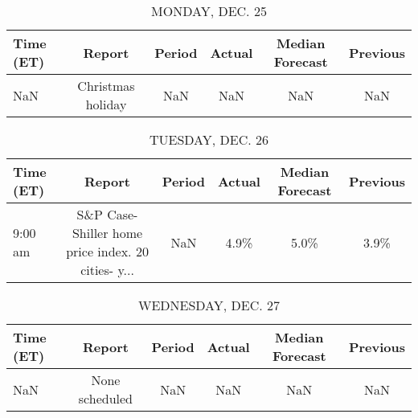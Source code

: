\documentclass{article}%
\begin{document}
%
\normalsize%


\begin{table}[htbp]%
\caption{MONDAY, DEC. 25}%
\centering%
\begin{adjustbox}{width=1\textwidth}%
\begin{tabular}{lccccc}
\toprule
Time (ET) &            Report & Period & Actual & Median Forecast & Previous \\
\midrule
      NaN & Christmas holiday &    NaN &    NaN &             NaN &      NaN \\
\bottomrule
\end{tabular}
%
\end{adjustbox}%
\end{table}

%


\begin{table}[htbp]%
\caption{TUESDAY, DEC. 26}%
\centering%
\begin{adjustbox}{width=1\textwidth}%
\begin{tabular}{lccccc}
\toprule
Time (ET) &                                             Report & Period & Actual & Median Forecast & Previous \\
\midrule
  9:00 am & S\&P Case-Shiller home price index. 20 cities- y... &    NaN &   4.9\% &            5.0\% &     3.9\% \\
\bottomrule
\end{tabular}
%
\end{adjustbox}%
\end{table}

%


\begin{table}[htbp]%
\caption{WEDNESDAY, DEC. 27}%
\centering%
\begin{adjustbox}{width=1\textwidth}%
\begin{tabular}{lccccc}
\toprule
Time (ET) &         Report & Period & Actual & Median Forecast & Previous \\
\midrule
      NaN & None scheduled &    NaN &    NaN &             NaN &      NaN \\
\bottomrule
\end{tabular}
%
\end{adjustbox}%
\end{table}

%
\end{document}
